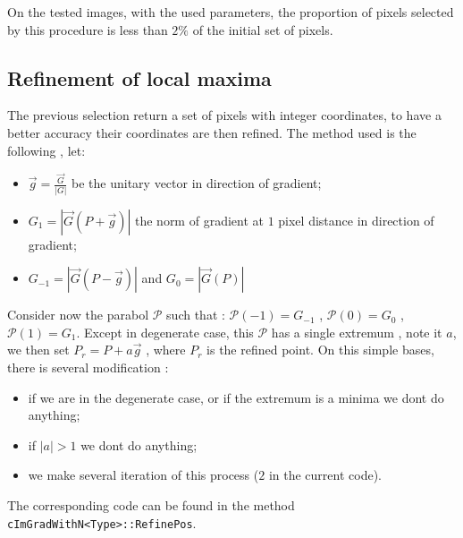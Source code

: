 On the tested images, with the used parameters, the proportion of pixels selected by this
procedure is less than $2\%$ of the initial set of pixels.



\subsection{Refinement of local maxima}
\label{Ref:Grad:Loc:Max}

The previous selection return a set of pixels with integer coordinates, to have a better accuracy
their coordinates are then refined. The method used is the following , let:

\begin{itemize}
     \item  $\vec g =  \frac{\vec G}{|G|} $ be the unitary vector in direction of gradient;

     \item   $G_{1} = |\vec G(P+\vec g)|$ the norm of gradient at $1$ pixel distance in direction of gradient;
     \item   $G_{-1} = |\vec G(P-\vec g)|$  and $G_0 = |\vec G(P)|$
\end{itemize}

Consider now the parabol $\mathcal {P}$  such that  : $\mathcal {P}(-1) = G_{-1} $ , $\mathcal {P}(0) = G_{0} $ ,
$\mathcal {P}(1) = G_{1} $. Except in degenerate case, this $\mathcal {P}$ has a single extremum , note it $a$, we
then set  $P_r = P+ a\vec g $ , where $P_r$ is the refined point. On this simple bases, there is several
modification :

\begin{itemize}
    \item if we are in the degenerate case, or if the extremum is a minima we dont do anything;
    \item if $|a| > 1 $ we dont do anything;
    \item we make several iteration of this process ($2$ in the current code).
\end{itemize}

The corresponding code can be found in the method {\tt cImGradWithN<Type>::RefinePos}.



